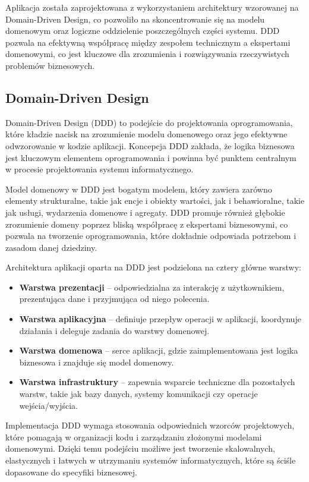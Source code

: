 \documentclass[shortabstract]{iithesis}
\begin{document}
Aplikacja została zaprojektowana z wykorzystaniem architektury wzorowanej na Domain-Driven Design, co pozwoliło na skoncentrowanie się na modelu domenowym oraz logiczne oddzielenie poszczególnych części systemu. DDD pozwala na efektywną współpracę między zespołem technicznym a ekspertami domenowymi, co jest kluczowe dla zrozumienia i rozwiązywania rzeczywistych problemów biznesowych.

\subsection{Domain-Driven Design}

Domain-Driven Design (DDD) to podejście do projektowania oprogramowania, które kładzie nacisk na zrozumienie modelu domenowego oraz jego efektywne odwzorowanie w kodzie aplikacji. Koncepcja DDD zakłada, że logika biznesowa jest kluczowym elementem oprogramowania i powinna być punktem centralnym w procesie projektowania systemu informatycznego.

Model domenowy w DDD jest bogatym modelem, który zawiera zarówno elementy strukturalne, takie jak encje i obiekty wartości, jak i behawioralne, takie jak usługi, wydarzenia domenowe i agregaty. DDD promuje również głębokie zrozumienie domeny poprzez bliską współpracę z ekspertami biznesowymi, co pozwala na tworzenie oprogramowania, które dokładnie odpowiada potrzebom i zasadom danej dziedziny.

Architektura aplikacji oparta na DDD jest podzielona na cztery główne warstwy:

\begin{itemize}
    \item \textbf{Warstwa prezentacji} – odpowiedzialna za interakcję z użytkownikiem, prezentująca dane i przyjmująca od niego polecenia.
    \item \textbf{Warstwa aplikacyjna} – definiuje przepływ operacji w aplikacji, koordynuje działania i deleguje zadania do warstwy domenowej.
    \item \textbf{Warstwa domenowa} – serce aplikacji, gdzie zaimplementowana jest logika biznesowa i znajduje się model domenowy.
    \item \textbf{Warstwa infrastruktury} – zapewnia wsparcie techniczne dla pozostałych warstw, takie jak bazy danych, systemy komunikacji czy operacje wejścia/wyjścia.
\end{itemize}

Implementacja DDD wymaga stosowania odpowiednich wzorców projektowych, które pomagają w organizacji kodu i zarządzaniu złożonymi modelami domenowymi. Dzięki temu podejściu możliwe jest tworzenie skalowalnych, elastycznych i łatwych w utrzymaniu systemów informatycznych, które są ściśle dopasowane do specyfiki biznesowej.
\end{document}
